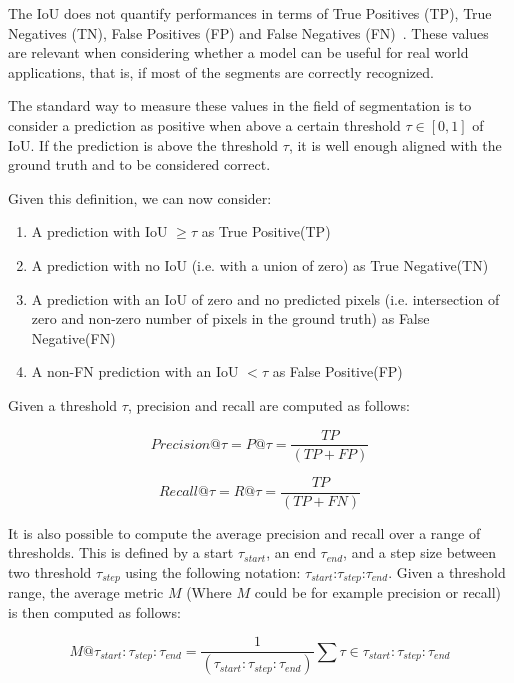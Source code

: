 \documentclass[oneside, english, bibtex]{kththesis}
\begin{document}
The IoU does not quantify performances in terms of True Positives (TP), True Negatives (TN), False Positives (FP) and False Negatives (FN)~\cite{davis2006relationship}. These values are relevant when considering whether a model can be useful for real world applications, that is, if most of the segments are correctly recognized.

The standard way to measure these values in the field of segmentation is to consider a prediction as positive when above a certain threshold $\tau \in [0,1]$ of IoU. If the prediction is above the threshold $\tau$, it is well enough aligned with the ground truth and to be considered correct.

Given this definition, we can now consider:
\begin{enumerate}
\item A prediction with IoU $\geq \tau$ as True Positive(TP)
\item A prediction with no IoU (i.e. with a union of zero) as True Negative(TN)
\item A prediction with an IoU of zero and no predicted pixels (i.e. intersection of zero and non-zero number of pixels in the ground truth) as False Negative(FN)
\item A non-FN prediction with an IoU $< \tau$ as False Positive(FP)
\end{enumerate}

Given a threshold $\tau$, precision and recall are computed as follows:

\begin{equation}
	Precision @ \tau = P@\tau = \frac{TP}{(TP + FP)}
  	\label{eqn:precision}
\end{equation}

\begin{equation}
	Recall @ \tau = R@\tau = \frac{TP}{(TP + FN)}
  	\label{eqn:recall}
\end{equation}

It is also possible to compute the average precision and recall over a range of thresholds. This is defined by a start $\tau_{start}$, an end $\tau_{end}$, and a step size between two threshold $\tau_{step}$ using the following notation: $\tau_{start}$:$\tau_{step}$:$\tau_{end}$. Given a threshold range, the average metric $M$ (Where $M$ could be for example precision or recall) is then computed as follows:

\begin{equation}
M@\tau_{start}:\tau_{step}:\tau_{end} = \frac{1}{(\tau_{start}:\tau_{step}:\tau_{end})} \sum{} \tau \in \tau_{start}:\tau_{step}:\tau_{end}
    \label{eqn:rangem}
\end{equation}
\end{document}
